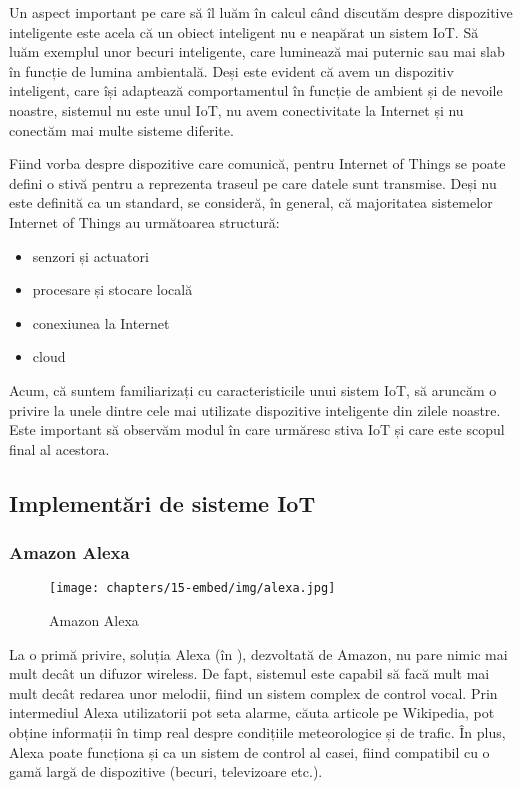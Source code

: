 Un aspect important pe care să îl luăm în calcul când discutăm despre
dispozitive inteligente este acela că un obiect inteligent nu e neapărat un
sistem IoT. Să luăm exemplul unor becuri inteligente, care luminează mai
puternic sau mai slab în funcție de lumina ambientală. Deși este evident că avem
un dispozitiv inteligent, care își adaptează comportamentul în funcție de
ambient și de nevoile noastre, sistemul nu este unul IoT, nu avem conectivitate
la Internet și nu conectăm mai multe sisteme diferite.

Fiind vorba despre dispozitive care comunică, pentru Internet of Things se poate
defini o stivă pentru a reprezenta traseul pe care datele sunt transmise. Deși
nu este definită ca un standard, se consideră, în general, că majoritatea
sistemelor Internet of Things au următoarea structură:

\begin{itemize}
	\item senzori și actuatori
	\item procesare și stocare locală
	\item conexiunea la Internet
	\item cloud
\end{itemize}

Acum, că suntem familiarizați cu caracteristicile unui sistem IoT, să aruncăm o
privire la unele dintre cele mai utilizate dispozitive inteligente din zilele
noastre. Este important să observăm modul în care urmăresc stiva IoT și care
este scopul final al acestora.

\subsection{Implementări de sisteme IoT}
\label{sec:embed:iot:impl}

\subsubsection{Amazon Alexa}
\label{sec:embed:iot:impl:alexa}

\begin{figure}[!htbp]
  \centering
  \texttt{[image: chapters/15-embed/img/alexa.jpg]}
  \caption{Amazon Alexa}
  \label{fig:embed:alexa}
\end{figure}

La o primă privire, soluția Alexa (în ), dezvoltată de Amazon, nu pare nimic mai mult
decât un difuzor wireless. De fapt, sistemul este capabil să facă mult mai mult
decât redarea unor melodii, fiind un sistem complex de control vocal. Prin
intermediul Alexa utilizatorii pot seta alarme, căuta articole pe
Wikipedia, pot obține informații în timp real despre condițiile
meteorologice și de trafic. În plus, Alexa poate funcționa și ca un sistem de
control al casei, fiind compatibil cu o gamă largă de dispozitive (becuri,
televizoare etc.).

